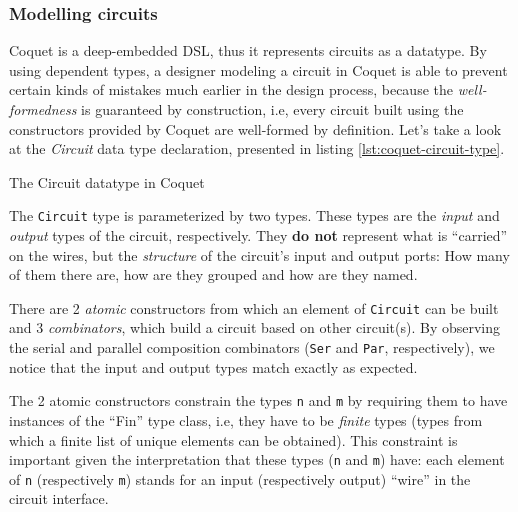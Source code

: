         \subsubsection{Modelling circuits}
        \label{subsubsec:coquet-modelling}
            Coquet is a deep-embedded DSL, thus it represents circuits as a datatype. By using
            dependent types, a designer modeling a circuit in Coquet is able to prevent certain
            kinds of mistakes much earlier in the design process, because the \emph{well-formedness}
            is guaranteed by construction, i.e, every circuit built using the constructors provided
            by Coquet are well-formed by definition. Let's take a look at the \emph{Circuit} data
            type declaration, presented in listing \ref{lst:coquet-circuit-type}.

            \begin{listing}[h!]
                \caption{The Circuit datatype in Coquet
                    \label{lst:coquet-circuit-type}}
            \end{listing}

            The \texttt{Circuit} type is parameterized by two types. These types are the
            \emph{input} and \emph{output} types of the circuit, respectively. They \textbf{do not}
            represent what is ``carried'' on the wires, but the \emph{structure} of the circuit's
            input and output ports: How many of them there are, how are they grouped and how are
            they named.

            There are 2 \emph{atomic} constructors from which an element of \texttt{Circuit} can
            be built and 3 \emph{combinators}, which build a circuit based on other circuit(s).
            By observing the serial and parallel composition combinators (\texttt{Ser} and
            \texttt{Par}, respectively), we notice that the input and output types match exactly
            as expected.

            The 2 atomic constructors constrain the types \texttt{n} and \texttt{m} by requiring
            them to have instances of the ``Fin'' type class, i.e, they have to be \emph{finite}
            types (types from which a finite list of unique elements can be obtained). This
            constraint is important given the interpretation that these types (\texttt{n} and
            \texttt{m}) have: each element of \texttt{n} (respectively \texttt{m}) stands for an
            input (respectively output) ``wire'' in the circuit interface.

